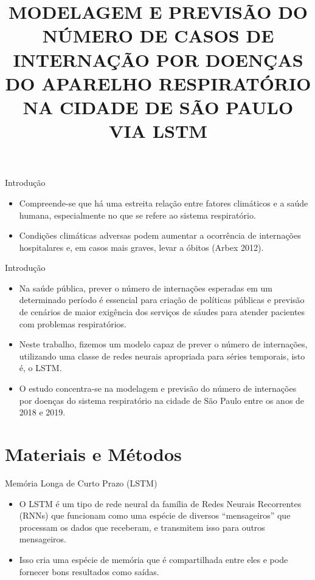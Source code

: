 \documentclass[
  ignorenonframetext,
]{beamer}
\title{MODELAGEM E PREVISÃO DO NÚMERO DE CASOS DE INTERNAÇÃO POR DOENÇAS
DO APARELHO RESPIRATÓRIO NA CIDADE DE SÃO PAULO VIA LSTM}
\author{}
\date{}
\providecommand{\tightlist}{%
  \setlength{\itemsep}{0pt}\setlength{\parskip}{0pt}}\usepackage{longtable,booktabs,array}
\begin{document}
\frame{\titlepage}

\begin{frame}{Introdução}
\label{introduuxe7uxe3o}
\begin{itemize}
\tightlist
\item
  Compreende-se que há uma estreita relação entre fatores climáticos e a
  saúde humana, especialmente no que se refere ao sistema respiratório.
\item
  Condições climáticas adversas podem aumentar a ocorrência de
  internações hospitalares e, em casos mais graves, levar a óbitos
  (Arbex 2012).
\end{itemize}
\end{frame}

\begin{frame}{Introdução}
\label{introduuxe7uxe3o-1}
\begin{itemize}
\tightlist
\item
  Na saúde pública, prever o número de internações esperadas em um
  determinado período é essencial para criação de políticas públicas e
  previsão de cenários de maior exigência dos serviços de sáudes para
  atender pacientes com problemas respiratórios.
\item
  Neste trabalho, fizemos um modelo capaz de prever o número de
  internações, utilizando uma classe de redes neurais apropriada para
  séries temporais, isto é, o LSTM.
\item
  O estudo concentra-se na modelagem e previsão do número de internações
  por doenças do sistema respiratório na cidade de São Paulo entre os
  anos de 2018 e 2019.
\end{itemize}
\end{frame}

\section{Materiais e Métodos}\label{materiais-e-muxe9todos}

\begin{frame}{Memória Longa de Curto Prazo (LSTM)}
\label{memuxf3ria-longa-de-curto-prazo-lstm}
\begin{itemize}
\tightlist
\item
  O LSTM é um tipo de rede neural da família de Redes Neurais
  Recorrentes (RNNs) que funcionam como uma espécie de diversos
  ``mensageiros'' que processam os dados que receberam, e transmitem
  isso para outros mensageiros.
\item
  Isso cria uma espécie de memória que é compartilhada entre eles e pode
  fornecer bons resultados como saídas.
\end{itemize}
\end{frame}
\end{document}
